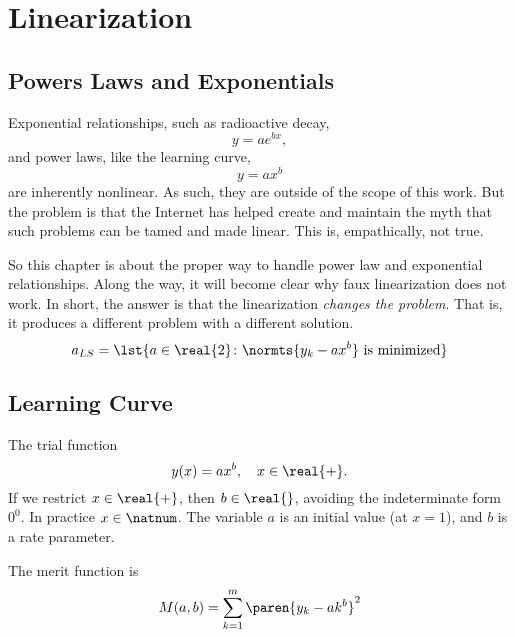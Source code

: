 \chapter{Linearization}

\section{Powers Laws and Exponentials}  %

Exponential relationships, such as radioactive decay,
      \begin{equation*}   %
           y = a e^{b x},
      \end{equation*}
and power laws, like the learning curve,
      \begin{equation}   %
           y = a x^{b}
       \label{eq:learning curve}
      \end{equation}
are inherently nonlinear. As such, they are outside of the scope of this work. But the problem is that the Internet has helped create and maintain the myth that such problems can be tamed and made linear. This is, empathically, not true.

So this chapter is about the proper way to handle power law and exponential relationships. Along the way, it will become clear why faux linearization does not work. In short, the answer is that the linearization \emph{changes the problem}. That is, it produces a different problem with a different solution.
       \begin{equation*}   %
           a_{LS}= \lst{a\in\real{2}\colon \normts{y_{k} - a x^{b}} \text{ is minimized}}
      \end{equation*}

\section{Learning Curve}  %
The trial function
  \begin{equation*}   %
      y(x) = a x^{b}, \quad x \in \real{+}.
  \end{equation*}
If we restrict $x \in \real{+}$, then $b \in \real{}$, avoiding the indeterminate form $0^{0}$. In practice $x \in \natnum$. The variable $a$ is an initial value (at $x = 1$), and $b$ is a rate parameter.

The merit function is
  \begin{equation}   %
      M(a, b) = \sum_{k=1}^{m}\paren{y_{k} - a k^{b}}^{2}
   \label{eq:learn merit surface}
  \end{equation}

